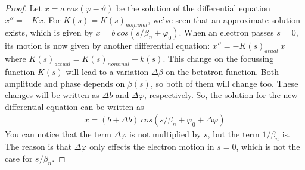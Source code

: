 \begin{proof}
	Let $x = a\ cos(\varphi-\vartheta)$ be the solution of the differential equation $x'' = -Kx$. For $K(s) = K(s)_{nominal}$, we've seen that an approximate solution exists, which is given by $x = b\ cos(s/\beta_n + \varphi_0)$. When an electron passes $s=0$, its motion is now given by another differential equation: $x'' = -K(s)_{atual}\ x$ where $K(s)_{actual} = K(s)_{nominal} + k(s)$. This change on the focussing function $K(s)$ will lead to a variation $\Delta \beta$ on the betatron function. Both amplitude and phase depends on $\beta(s)$, so both of them will change too. These changes will be written as $\Delta b$ and $\Delta \varphi$, respectively. So, the solution for the new differential equation can be written as
	\begin{align*}
		x = (b+\Delta b)\ cos(s/\beta_n + \varphi_0 + \Delta \varphi)
	\end{align*}
	You can notice that the term $\Delta \varphi$ is not multiplied by $s$, but the term $1/\beta_n$ is. The reason is that $\Delta \varphi$ only effects the electron motion in $s=0$, which is not the case for $s/\beta_n$.
	

\end{proof}
